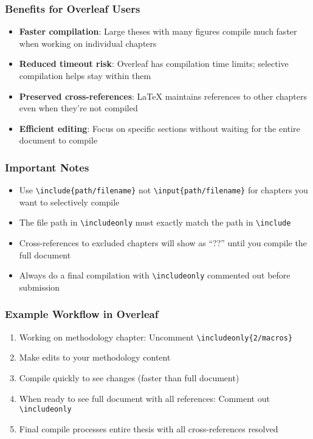 \subsubsection{Benefits for Overleaf Users}

\begin{itemize}
    \item \textbf{Faster compilation}: Large theses with many figures compile much faster when working on individual chapters
    \item \textbf{Reduced timeout risk}: Overleaf has compilation time limits; selective compilation helps stay within them
    \item \textbf{Preserved cross-references}: LaTeX maintains references to other chapters even when they're not compiled
    \item \textbf{Efficient editing}: Focus on specific sections without waiting for the entire document to compile
\end{itemize}

\subsubsection{Important Notes}

\begin{itemize}
    \item Use \texttt{\textbackslash include\{path/filename\}} not \texttt{\textbackslash input\{path/filename\}} for chapters you want to selectively compile
    \item The file path in \texttt{\textbackslash includeonly} must exactly match the path in \texttt{\textbackslash include}
    \item Cross-references to excluded chapters will show as ``??'' until you compile the full document
    \item Always do a final compilation with \texttt{\textbackslash includeonly} commented out before submission
\end{itemize}

\subsubsection{Example Workflow in Overleaf}

\begin{enumerate}
    \item Working on methodology chapter: Uncomment \texttt{\textbackslash includeonly\{2/macros\}}
    \item Make edits to your methodology content
    \item Compile quickly to see changes (faster than full document)
    \item When ready to see full document with all references: Comment out \texttt{\textbackslash includeonly}
    \item Final compile processes entire thesis with all cross-references resolved
\end{enumerate}

